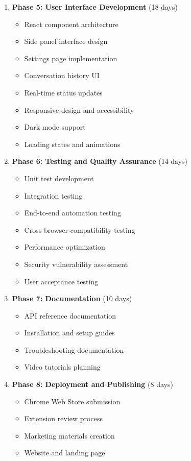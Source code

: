 \documentclass[12pt,a4paper]{article}
\begin{document}
\begin{enumerate}
    \item \textbf{Phase 5: User Interface Development} (18 days)
    \begin{itemize}
        \item React component architecture
        \item Side panel interface design
        \item Settings page implementation
        \item Conversation history UI
        \item Real-time status updates
        \item Responsive design and accessibility
        \item Dark mode support
        \item Loading states and animations
    \end{itemize}
    
    \item \textbf{Phase 6: Testing and Quality Assurance} (14 days)
    \begin{itemize}
        \item Unit test development
        \item Integration testing
        \item End-to-end automation testing
        \item Cross-browser compatibility testing
        \item Performance optimization
        \item Security vulnerability assessment
        \item User acceptance testing
    \end{itemize}
    
    \item \textbf{Phase 7: Documentation} (10 days)
    \begin{itemize}
        
        \item API reference documentation
        
        
        \item Installation and setup guides
        \item Troubleshooting documentation
        \item Video tutorials planning
    \end{itemize}
    
    \item \textbf{Phase 8: Deployment and Publishing} (8 days)
    \begin{itemize}
        \item Chrome Web Store submission
        \item Extension review process
        \item Marketing materials creation
        \item Website and landing page
    

\end{itemize}
\end{enumerate}
\end{document}
